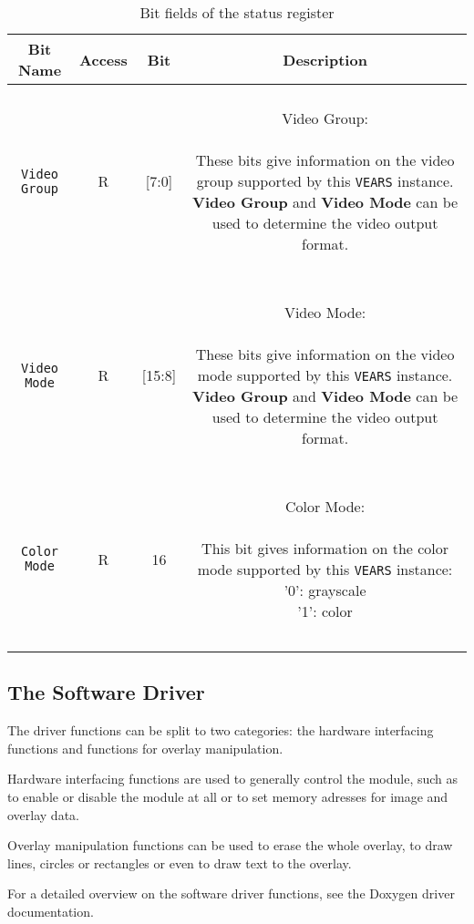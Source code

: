 



\begin{longtable}[htb]{|c|c|c|c|}
\hline 
\textbf{Bit Name} & \textbf{Access} & \textbf{Bit} & \textbf{Description} \\
\hline
\endhead

\texttt{Video Group} & R & [7:0] &
\parbox{7cm}{ ~ \\ Video Group: \\ ~ \\ \small
These bits give information on the video group supported by this \texttt{VEARS} instance. \textbf{Video Group} and \textbf{Video Mode} can be used to determine the video output format.
\\ ~ } \\

\hline

\texttt{Video Mode} & R & [15:8] &
\parbox{7cm}{ ~ \\ Video Mode: \\ ~ \\ \small
These bits give information on the video mode supported by this \texttt{VEARS} instance. \textbf{Video Group} and \textbf{Video Mode} can be used to determine the video output format.
\\ ~ } \\

\hline

\texttt{Color Mode} & R & 16 &
\parbox{7cm}{ ~ \\ Color Mode: \\ ~ \\ \small
This bit gives information on the color mode supported by this \texttt{VEARS} instance: \\
'0': grayscale \\
'1': color
\\ ~ } \\

\hline

\caption{Bit fields of the status register}
\label{07-vears-status-bits}
\end{longtable}






\subsection{The Software Driver}

The driver functions can be split to two categories: the hardware interfacing functions and functions for overlay manipulation.

Hardware interfacing functions are used to generally control the module, such as to enable or disable the module at all or to set memory adresses for image and overlay data. 

Overlay manipulation functions can be used to erase the whole overlay, to draw lines, circles or rectangles or even to draw text to the overlay. 

For a detailed overview on the software driver functions, see the \asterics Doxygen driver documentation.
